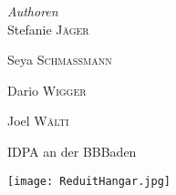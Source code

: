 \begin{titlepage}
	{\large\textit{Authoren}}\\
	        Stefanie \textsc{Jäger} %
            
            Seya \textsc{Schmassmann} %

            Dario \textsc{Wigger} %
            
			Joel \textsc{Wälti} %
	
	\vfill\vfill\vfill %
	
	{\large IDPA an der BBBaden} %
	
	
	\vfill\vfill
	\texttt{[image: ReduitHangar.jpg]}\\[1cm] %
	 
	
	\vfill %
	
\end{titlepage}